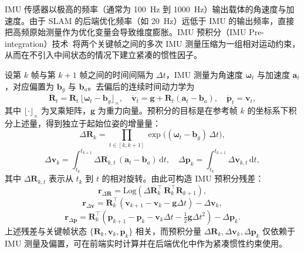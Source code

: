 IMU 传感器以极高的频率（通常为 100~Hz 到 1000~Hz）输出载体的角速度与加速度。由于 SLAM 的后端优化频率（如 20~Hz）远低于 IMU 的输出频率，直接把高频原始测量作为优化变量会导致维度膨胀。IMU 预积分（IMU Pre-integration）技术~\cite{forster2017onmanifold}将两个关键帧之间的多次 IMU 测量压缩为一组相对运动约束，从而在不引入中间状态的情况下建立紧凑的惯性因子。

设第 $k$ 帧与第 $k+1$ 帧之间的时间间隔为 $\Delta t$，IMU 测量为角速度 $\boldsymbol{\omega}_t$ 与加速度 $\mathbf{a}_t$，对应偏置为 $\mathbf{b}_{g}$ 与 $\mathbf{b}_{a}$。去偏后的连续时间动力学为
\begin{equation}
\dot{\mathbf{R}}_t = \mathbf{R}_t\,\lfloor \boldsymbol{\omega}_t-\mathbf{b}_g \rfloor_\times,
\quad
\dot{\mathbf{v}}_t = \mathbf{g} + \mathbf{R}_t(\mathbf{a}_t-\mathbf{b}_a),
\quad
\dot{\mathbf{p}}_t = \mathbf{v}_t,
\end{equation}
其中 $\lfloor\cdot\rfloor_\times$ 为叉乘矩阵，$\mathbf{g}$ 为重力向量。预积分的目标是在参考帧 $k$ 的坐标系下积分上述量，得到独立于起始位姿的增量量：
\begin{equation}
\Delta\mathbf{R}_{k} = \prod_{t\in[k,k+1]} \exp\big((\boldsymbol{\omega}_t-\mathbf{b}_g)\,\Delta t\big),
\end{equation}
\begin{equation}
\Delta\mathbf{v}_{k} = \int_{t_k}^{t_{k+1}} \Delta\mathbf{R}_{k,t}\,(\mathbf{a}_t-\mathbf{b}_a)\,\mathrm{d}t,\quad
\Delta\mathbf{p}_{k} = \int_{t_k}^{t_{k+1}} \Delta\mathbf{v}_{k,t}\,\mathrm{d}t,
\end{equation}
其中 $\Delta\mathbf{R}_{k,t}$ 表示从 $t_k$ 到 $t$ 的相对旋转。由此可构造 IMU 预积分残差：
\begin{equation}
\mathbf{r}_{\Delta\mathbf{R}} = \mathrm{Log}\!\left(\Delta\mathbf{R}_{k}^{\top}\,\mathbf{R}_k^{\top}\mathbf{R}_{k+1}\right),
\end{equation}
\begin{equation}
\mathbf{r}_{\Delta\mathbf{v}} = \mathbf{R}_k^{\top}(\mathbf{v}_{k+1}-\mathbf{v}_k-\mathbf{g}\Delta t) - \Delta\mathbf{v}_{k},
\end{equation}
\begin{equation}
\mathbf{r}_{\Delta\mathbf{p}} = \mathbf{R}_k^{\top}(\mathbf{p}_{k+1}-\mathbf{p}_k-\mathbf{v}_k\Delta t-\tfrac{1}{2}\mathbf{g}\Delta t^2) - \Delta\mathbf{p}_{k}.
\end{equation}
上述残差与关键帧状态 $\{\mathbf{R}_k,\mathbf{v}_k,\mathbf{p}_k\}$ 相关，而预积分量 $\Delta\mathbf{R}_{k},\Delta\mathbf{v}_{k},\Delta\mathbf{p}_{k}$ 仅依赖于 IMU 测量及偏置，可在前端实时计算并在后端优化中作为紧凑惯性约束使用。

